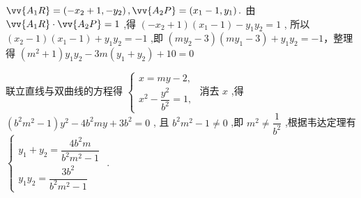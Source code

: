 \begin{enumerate}
\begin{enumerate}
\begin{jieda}
\begin{enumerate}
            $\vv{{A}_{1}R} = \left( {-{x}_{2} + 1, - {y}_{2}}\right) ,\vv{{A}_{2}P} = \left( {{x}_{1} - 1,{y}_{1}}\right) .$
            由 $\vv{{A}_{1}R} \cdot  \vv{{A}_{2}P} = 1$ ,得 $\left( {-{x}_{2} + 1}\right) \left( {{x}_{1} - 1}\right)  - {y}_{1}{y}_{2} = 1$ ,
            所以 $\left( {{x}_{2} - 1}\right) \left( {{x}_{1} - 1}\right)  + {y}_{1}{y}_{2} =  - 1$ ,即 $\left( {m{y}_{2} - 3}\right) \left( {m{y}_{1} - 3}\right)  + {y}_{1}{y}_{2} =  - 1$，整理得 $\left(m^2 + 1\right) {y}_{1}{y}_{2} - {3m}\left( {{y}_{1} + {y}_{2}}\right)  + {10} = 0$

            联立直线与双曲线的方程得 $\left\{  \begin{array}{l} x = {my} - 2, \\  {x}^{2} - \dfrac{{y}^{2}}{{b}^{2}} = 1, \end{array}\right.$
            消去 $x$ ,得 $\left( {{b}^{2}{m}^{2} - 1}\right) {y}^{2} - 4{b}^{2}{my} + 3{b}^{2} = 0$ ,
            且 ${b}^{2}{m}^{2} - 1 \neq  0$ ,即 ${m}^{2} \neq  \dfrac{1}{{b}^{2}}$ ,根据韦达定理有$\left\{\begin{array}{l}
                 {y}_{1} + {y}_{2} = \dfrac{4{b}^{2}m}{{b}^{2}{m}^{2} - 1}  \\
                 {y}_{1}{y}_{2} = \dfrac{3{b}^{2}}{{b}^{2}{m}^{2} - 1} 
            \end{array}\right.$ .
            

\end{enumerate}
\end{jieda}
\end{enumerate}
\end{enumerate}
